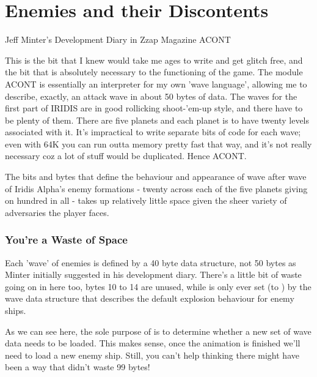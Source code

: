 \chapter{Enemies and their Discontents} 

\lstset{style=6502Style}

\begin{q}{Jeff Minter's Development Diary in Zzap Magazine\cite{planner}}
ACONT 

This is the bit that I knew would take me ages to write and get glitch
free, and the bit that is absolutely necessary to the functioning of the game.
The module ACONT is essentially an interpreter for my own 'wave language',
allowing me to describe, exactly, an attack wave in about 50 bytes of data. The
waves for the first part of IRIDIS are in good rollicking shoot-'em-up style,
and there have to be plenty of them. There are five planets and each planet is
to have twenty levels associated with it. It's impractical to write separate
bits of code for each wave; even with 64K you can run outta memory pretty fast
that way, and it's not really necessary coz a lot of stuff would be duplicated.
Hence ACONT.

\end{q}

The bits and bytes that define the behaviour and appearance of
wave after wave of Iridis Alpha's enemy formations - twenty across each of the
five planets giving on hundred in all - takes up relatively little space given
the sheer variety of adversaries the player faces.

\subsection{You're a Waste of Space}
Each 'wave' of enemies is defined by a 40 byte data structure, not 50 bytes as
Minter initially suggested in his development diary. There's a little bit of 
waste going on in here too, bytes 10 to 14 are unused, while  is only
ever set (to ) by the wave data structure that describes the default explosion 
behaviour for enemy ships.

As we can see here, the sole purpose of  is to determine whether a
new set of wave data needs to be loaded. This makes sense, once the animation is finished
we'll need to load a new enemy ship. Still, you can't help thinking there might have been 
a way that didn't waste 99 bytes! 

